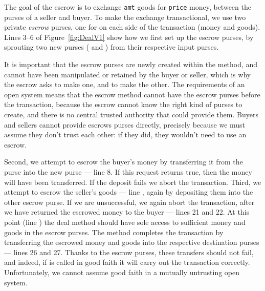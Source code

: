 The goal of the escrow is to exchange \texttt{amt} goods for
\texttt{price} money, between the purses of a seller and buyer.
To make the exchange transactional, we use %
two private \textit{escrow} purses, one for on each side of the
transaction (money and goods). 
%
Lines 3--6 of Figure~\ref{fig:DealV1} show how we first set up the
escrow purses, by sprouting two new purses ( and
) from their respective input purses.  

It is
important that the escrow purses are newly created within the method,
and cannot have been manipulated or retained by the buyer or seller,
which is why the escrow asks  to make one, and
 to make the other.  The requirements of an open
system means that the escrow method cannot have the escrow purses
before the transaction, because 
the escrow cannot know the right kind of purses to create, 
and there is no central trusted authority
that could provide them.
Buyers and sellers cannot provide escrows purses directly, 
precisely because we must assume 
they don't trust each other: if they did, 
they wouldn't need to use an escrow.

Second, we attempt to escrow the buyer's money by transferring it from
the \- purse into the new  purse ---
line 8.  If this  request returns true, then the money
will have been transferred. If the deposit fails we abort the
transaction.
%
Third, we attempt to escrow the seller's goods --- line , again by
depositing them into the other escrow purse.  If we are unsuccessful,
we again abort the transaction, after we have returned the escrowed
money to the buyer --- lines 21 and 22.
%
At this point (line ) the deal method should have sole access
to sufficient money and goods in the escrow purses.  The method
completes the transaction by transferring the escrowed money and goods
into the respective destination purses --- lines 26 and 27. Thanks to
the escrow purses, these transfers should not fail, and indeed, if
 is called in good faith it will carry out the transaction
correctly.  Unfortunately, we cannot assume good faith in a mutually
untrusting open system.


